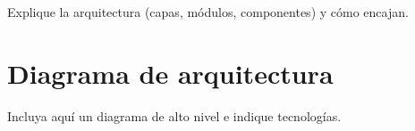 Explique la arquitectura (capas, módulos, componentes) y cómo encajan.
\section*{Diagrama de arquitectura}
Incluya aquí un diagrama de alto nivel e indique tecnologías.
